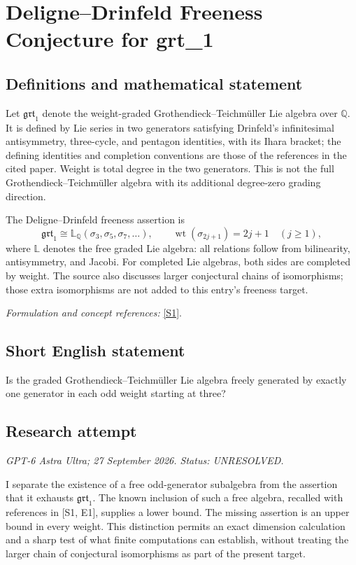 \documentclass[11pt]{article}
\begin{document}
\section*{\texorpdfstring{Deligne–Drinfeld Freeness Conjecture for grt\_1}{Deligne–Drinfeld Freeness Conjecture for grt\_1}}\label{statement}
\subsection{Definitions and mathematical statement}
Let $\mathfrak{grt}_1$ denote the weight-graded Grothendieck--Teichm\"uller Lie algebra over ${\mathbb{Q}}$. It is defined by Lie series in two generators satisfying Drinfeld's infinitesimal antisymmetry, three-cycle, and pentagon identities, with its Ihara bracket; the defining identities and completion conventions are those of the references in the cited paper. Weight is total degree in the two generators. This is not the full Grothendieck--Teichm\"uller algebra with its additional degree-zero grading direction.

The Deligne--Drinfeld freeness assertion is
\[
 \mathfrak{grt}_1\cong
 \mathbb L_{{\mathbb{Q}}}(\sigma_3,\sigma_5,\sigma_7,\ldots),
 \qquad \operatorname{wt}(\sigma_{2j+1})=2j+1\quad(j\ge1),
\]
where $\mathbb L$ denotes the free graded Lie algebra: all relations follow from bilinearity, antisymmetry, and Jacobi. For completed Lie algebras, both sides are completed by weight. The source also discusses larger conjectural chains of isomorphisms; those extra isomorphisms are not added to this entry's freeness target.
\par\smallskip\textit{Formulation and concept references:} \href{https://arxiv.org/html/2508.08081}{[S1]}.

\subsection{Short English statement}
Is the graded Grothendieck--Teichm\"uller Lie algebra freely generated by exactly one generator in each odd weight starting at three?
\subsection{Research attempt}
\textit{GPT-6 Astra Ultra; 27 September 2026. Status: UNRESOLVED.}

I separate the existence of a free odd-generator subalgebra from the
assertion that it exhausts $\mathfrak{grt}_1$. The known inclusion of
such a free algebra, recalled with references in [S1, E1], supplies a
lower bound. The missing assertion is an upper bound in every weight.
This distinction permits an exact dimension calculation and a sharp test
of what finite computations can establish, without treating the larger
chain of conjectural isomorphisms as part of the present target.
\end{document}

